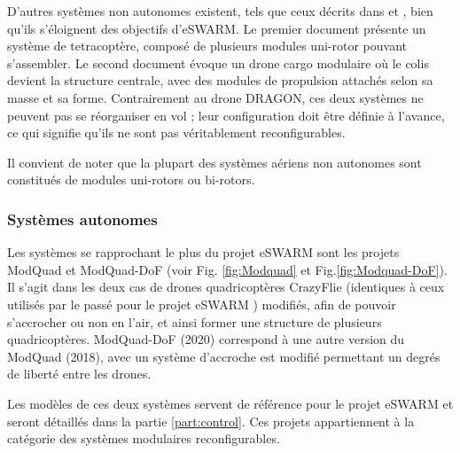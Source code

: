 D'autres systèmes non autonomes existent, tels que ceux décrits dans \cite{garanger_modeling_2020} et \cite{schiano_reconfigurable_2022}, bien qu'ils s'éloignent des objectifs d'eSWARM. Le premier document présente un système de tetracoptère, composé de plusieurs modules uni-rotor pouvant s'assembler. Le second document évoque un drone cargo modulaire où le colis devient la structure centrale, avec des modules de propulsion attachés selon sa masse et sa forme. Contrairement au drone DRAGON, ces deux systèmes ne peuvent pas se réorganiser en vol ; leur configuration doit être définie à l'avance, ce qui signifie qu'ils ne sont pas véritablement reconfigurables.

Il convient de noter que la plupart des systèmes aériens non autonomes sont constitués de modules uni-rotors ou bi-rotors.


\subsubsection*{Systèmes autonomes}

Les systèmes se rapprochant le plus du projet eSWARM sont les projets ModQuad \cite{saldana_modquad_2018} et ModQuad-DoF \cite{gabrich_modquad-dof_2020} (voir Fig. \ref{fig:Modquad} et Fig.\ref{fig:Modquad-DoF}). Il s'agit dans les deux cas de drones quadricoptères CrazyFlie (identiques à ceux utilisés par le passé pour le projet eSWARM  \cite{bonnel_modeling_2024,boegeat_rapport_2023}) modifiés, afin de pouvoir s'accrocher ou non en l'air, et ainsi former une structure de plusieurs quadricoptères. ModQuad-DoF (2020) correspond à une autre version du ModQuad (2018), avec un système d'accroche est modifié permettant un degrés de liberté entre les drones. 

Les modèles de ces deux systèmes servent de référence pour le projet eSWARM et seront détaillés dans la partie \ref{part:control}. Ces projets appartiennent à la catégorie des systèmes modulaires reconfigurables.


